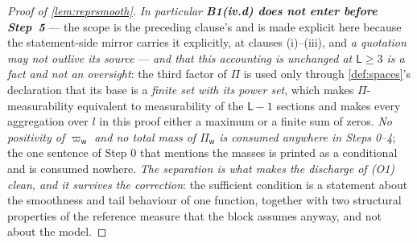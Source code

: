 \begin{proof}[Proof of \cref{lem:reprsmooth}]
\emph{In particular \textbf{B1(iv.d) does not enter before Step~5}} --- the scope is the preceding
clause's and is made explicit here because the statement-side mirror carries it explicitly, at clauses
\textup{(i)}--\textup{(iii)}, and \emph{a quotation may not outlive its source} ---
\emph{and that this accounting is unchanged at
$\mathsf L\ge3$ is a fact and not an oversight}: the third factor of $\Pi$ is used only through
\cref{def:spaces}'s declaration that its base is a \emph{finite set with its power set}, which makes
$\Pi$-measurability equivalent to measurability of the $\mathsf L-1$ sections and makes every
aggregation over $l$ in this proof either a maximum or a finite sum of zeros. \emph{No positivity of
$\varpi_{\mathsf w}$ and no total mass of $\Pi_{\mathsf w}$ is consumed anywhere in Steps 0--4}; the one
sentence of Step 0 that mentions the masses is printed as a conditional and is consumed nowhere. \emph{The separation is what makes the discharge of \textup{(O1)}
clean, and it survives the correction}: the sufficient condition is a statement about the smoothness and
tail behaviour of one function, together with two structural properties of the reference measure that the
block assumes anyway, and not about the model.
\end{proof}

